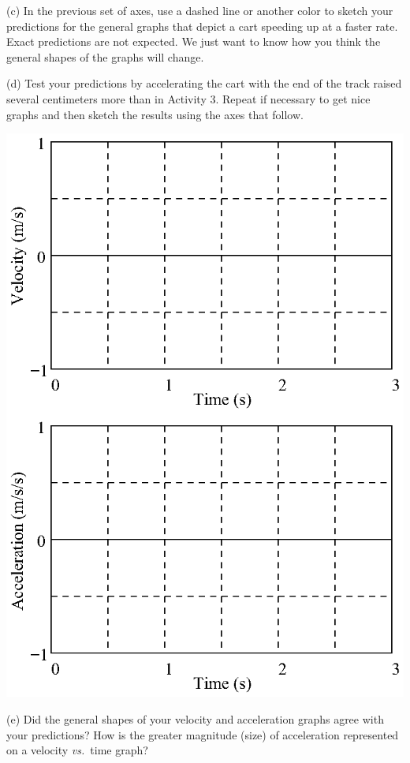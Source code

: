 (c) In the previous set of axes, use a dashed line or another color to sketch
your predictions for the general graphs that depict a cart speeding up at a
faster rate. Exact predictions are not expected. We just want to know how you
think the general shapes of the graphs will change.

\pagebreak[2]
(d) Test your predictions by accelerating the cart with the end of the track raised several centimeters more than in Activity 3. Repeat if necessary to get nice graphs and then sketch the results using the axes that follow.

{\par\centering \includegraphics{changing/changing_fig5.eps} \par}

(e) Did the general shapes of your velocity and acceleration graphs agree with
your predictions? How is the greater magnitude (size) of acceleration represented
on a velocity \textit{vs.}~time graph? 
\answerspace{25mm}

